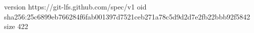 version https://git-lfs.github.com/spec/v1
oid sha256:25c6899eb766284f6fab001397d7521ceb271a78c5d9d2d7e2fb22bbb92f5842
size 422
